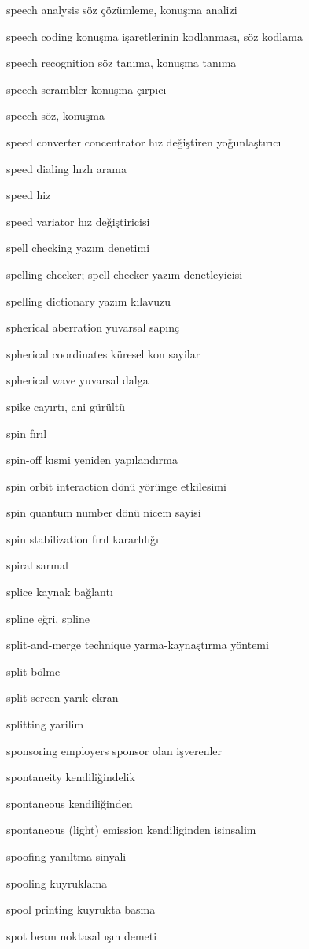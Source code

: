 \documentclass[12pt,fleqn]{article}\usepackage{../../common}
\begin{document}
speech analysis söz çözümleme, konuşma analizi

speech coding konuşma işaretlerinin kodlanması, söz kodlama

speech recognition söz tanıma, konuşma tanıma

speech scrambler konuşma çırpıcı

speech söz, konuşma

speed converter concentrator hız değiştiren yoğunlaştırıcı

speed dialing hızlı arama

speed hiz

speed variator hız değiştiricisi

spell checking yazım denetimi

spelling checker; spell checker yazım denetleyicisi

spelling dictionary yazım kılavuzu

spherical aberration yuvarsal sapınç

spherical coordinates küresel kon sayilar

spherical wave yuvarsal dalga

spike cayırtı, ani gürültü

spin fırıl

spin-off kısmi yeniden yapılandırma

spin orbit interaction dönü yörünge etkilesimi

spin quantum number dönü nicem sayisi

spin stabilization fırıl kararlılığı

spiral sarmal

splice kaynak bağlantı

spline eğri, spline

split-and-merge technique yarma-kaynaştırma yöntemi

split bölme

split screen yarık ekran

splitting yarilim

sponsoring employers sponsor olan işverenler

spontaneity kendiliğindelik

spontaneous kendiliğinden

spontaneous (light) emission kendiliginden isinsalim

spoofing yanıltma sinyali

spooling kuyruklama

spool printing kuyrukta basma

spot beam noktasal ışın demeti
\end{document}
